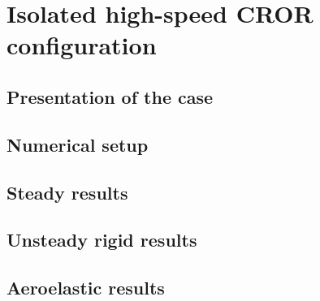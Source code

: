 \chapter{Isolated high-speed CROR configuration}
\label{cha:dream_isolated_hs}

\chabstract{}

\minitoc
\newpage

\section{Presentation of the case}
\label{sec:dream_presentation}


\section{Numerical setup}
\label{sec:dream_numerical}


\section{Steady results}
\label{sec:dream_ls_steady_results}


\section{Unsteady rigid results}
\label{sec:dream_ls_rigid_results}


\section{Aeroelastic results}
\label{sec:dream_ls_ael_results}


\chconclu{}
